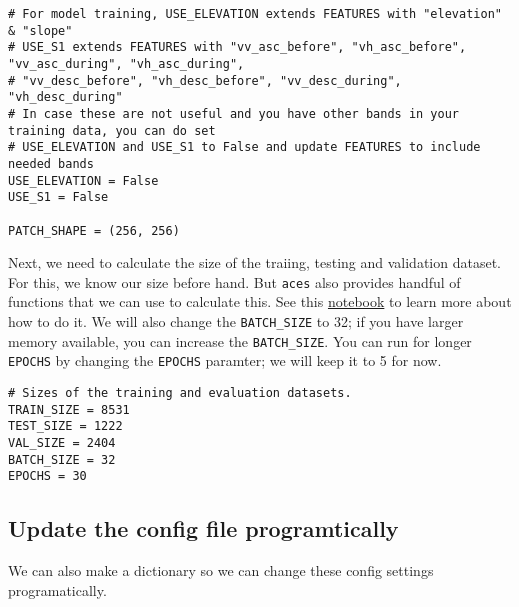 \documentclass[
  letterpaper,
  DIV=11,
  numbers=noendperiod]{scrreprt}
\begin{document}
\begin{verbatim}
# For model training, USE_ELEVATION extends FEATURES with "elevation" & "slope"
# USE_S1 extends FEATURES with "vv_asc_before", "vh_asc_before", "vv_asc_during", "vh_asc_during",
# "vv_desc_before", "vh_desc_before", "vv_desc_during", "vh_desc_during"
# In case these are not useful and you have other bands in your training data, you can do set
# USE_ELEVATION and USE_S1 to False and update FEATURES to include needed bands
USE_ELEVATION = False
USE_S1 = False

PATCH_SHAPE = (256, 256)
\end{verbatim}

Next, we need to calculate the size of the traiing, testing and
validation dataset. For this, we know our size before hand. But
\texttt{aces} also provides handful of functions that we can use to
calculate this. See this
\href{https://colab.research.google.com/drive/12WgDI3ptFZHmcfOw89fmPSsDwO-sXIUH?usp=sharing}{notebook}
to learn more about how to do it. We will also change the
\texttt{BATCH\_SIZE} to 32; if you have larger memory available, you can
increase the \texttt{BATCH\_SIZE}. You can run for longer
\texttt{EPOCHS} by changing the \texttt{EPOCHS} paramter; we will keep
it to 5 for now.

\begin{verbatim}
# Sizes of the training and evaluation datasets.
TRAIN_SIZE = 8531
TEST_SIZE = 1222
VAL_SIZE = 2404
BATCH_SIZE = 32
EPOCHS = 30
\end{verbatim}

\subsection{Update the config file
programtically}\label{update-the-config-file-programtically}

We can also make a dictionary so we can change these config settings
programatically.
\end{document}
